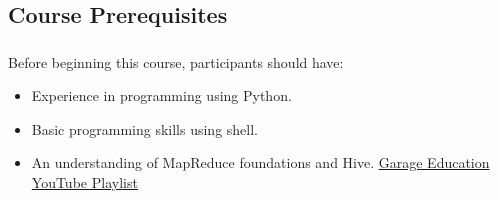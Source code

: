 \subsection{Course Prerequisites}
\begin{frame}
    \frametitle{\subsecname}
    Before beginning this course, participants should have:
    \begin{itemize}
        \item Experience in programming using Python.
        \item Basic programming skills using shell.
        \item An understanding of MapReduce foundations and Hive. \href{https://www.youtube.com/playlist?list=PLxNoJq6k39G8Ak39PDC-oYvp6ZRvIn3Pa}{Garage Education YouTube Playlist}
    \end{itemize}

\end{frame}

